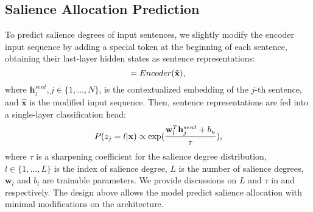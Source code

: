 \documentclass[11pt]{article}
\begin{document}
\subsection{Salience Allocation Prediction}
To predict salience degrees of input sentences, we slightly modify the encoder input sequence by adding a special token at the beginning of each sentence, obtaining their last-layer hidden states as sentence representations:
\vspace{-1mm}
\begin{equation}
    [\mathbf{h}^{sent}_1, \dots, \mathbf{h}^{sent}_n] = Encoder(\mathbf{\hat{x}}) ,
    \label{eq:sentence_encoder_hidden}
    \vspace{-1mm}
\end{equation}
where $\mathbf{h}^{sent}_j, j \in \{1, \dots, N\}$, is the contextualized embedding of the $j$-th sentence, and $\mathbf{\hat{x}}$ is the modified input sequence.
Then, sentence representations are fed into a single-layer classification head:
\vspace{-1mm}
\begin{equation}
    P(z_j=l|\mathbf{x}) \propto \exp(\frac{\mathbf{w}_l^{T}\mathbf{h}^{sent}_j + b_{u}}{\tau}) ,
    \label{eq:cls_prob}
    \vspace{-1mm}
\end{equation}
where $\tau$ is a sharpening coefficient for the salience degree distribution, $l \in \{1, \dots, L\}$ is the index of salience degree, $L$ is the number of salience degrees, $\mathbf{w}_l$ and $b_{l}$ are trainable parameters. 
We provide discussions on $L$ and $\tau$ in  and  respectively.
The design above allows the model predict salience allocation with minimal modifications on the architecture.
\end{document}
